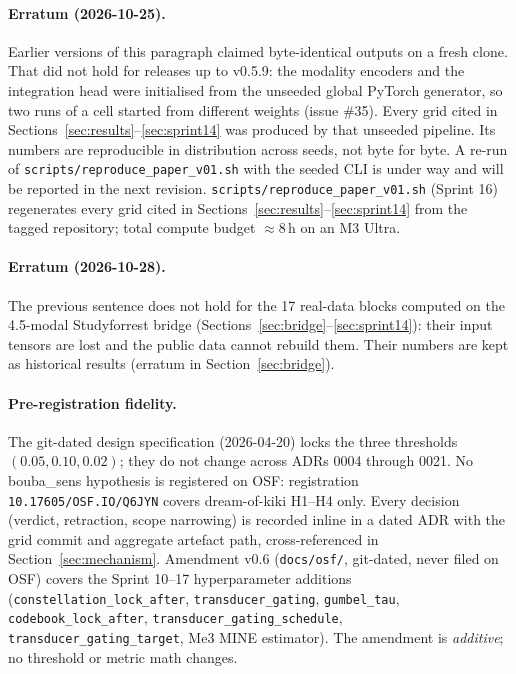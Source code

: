 \documentclass{article}
\begin{document}
\paragraph{Erratum (2026-10-25).} Earlier versions of this paragraph
claimed byte-identical outputs on a fresh clone. That did not hold
for releases up to v0.5.9: the modality encoders and the integration
head were initialised from the unseeded global PyTorch generator, so
two runs of a cell started from different weights (issue \#35).
Every grid cited in Sections~\ref{sec:results}--\ref{sec:sprint14}
was produced by that unseeded pipeline. Its numbers are reproducible
in distribution across seeds, not byte for byte. A re-run of
\texttt{scripts/reproduce\_paper\_v01.sh} with the seeded CLI is
under way and will be reported in the next revision.
\texttt{scripts/reproduce\_paper\_v01.sh} (Sprint 16) regenerates
every grid cited in Sections~\ref{sec:results}--\ref{sec:sprint14}
from the tagged repository; total compute budget
$\approx 8$\,h on an M3 Ultra.

\paragraph{Erratum (2026-10-28).} The previous sentence does not hold
for the 17 real-data blocks computed on the 4.5-modal Studyforrest
bridge (Sections~\ref{sec:bridge}--\ref{sec:sprint14}): their input tensors
are lost and the public data cannot rebuild them. Their numbers are
kept as historical results (erratum in Section~\ref{sec:bridge}).

\paragraph{Pre-registration fidelity.}
The git-dated design specification (2026-04-20) locks the three
thresholds $(0.05, 0.10, 0.02)$; they do not change across
ADRs 0004 through 0021. No bouba\_sens hypothesis is registered on
OSF: registration \texttt{10.17605/OSF.IO/Q6JYN} covers
dream-of-kiki H1--H4 only. Every decision (verdict, retraction, scope
narrowing) is recorded inline in a dated ADR with the grid commit
and aggregate artefact path, cross-referenced in
Section~\ref{sec:mechanism}. Amendment v0.6 (\texttt{docs/osf/},
git-dated, never filed on OSF) covers the
Sprint 10--17 hyperparameter additions
(\texttt{constellation\_lock\_after}, \texttt{transducer\_gating},
\texttt{gumbel\_tau}, \texttt{codebook\_lock\_after},
\texttt{transducer\_gating\_schedule},
\texttt{transducer\_gating\_target}, Me3 MINE estimator). The
amendment is \emph{additive}; no threshold or metric math changes.
\end{document}
